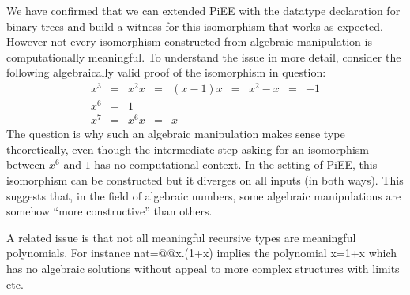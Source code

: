 \documentclass[preprint]{sigplanconf}
\begin{document}
We have confirmed that we can extended {{PiEE}} with the datatype
declaration for binary trees and build a witness for this isomorphism
that works as expected. However not every isomorphism constructed from
algebraic manipulation is computationally meaningful. To understand the
issue in more detail, consider the following algebraically valid proof
of the isomorphism in question:
\[\begin{array}{rclclclcl}
x^3 &=& x^2 x &=& (x-1) x &=& x^2 - x &=& -1 \\
x^6 &=& 1 \\
x^7 &=& x^6 x &=& x
\end{array}\]
The question is why such an algebraic manipulation makes sense type
theoretically, even though the intermediate step asking for an isomorphism
between $x^6$ and $1$ has no computational context. In the setting of
{{PiEE}}, this isomorphism can be constructed but it diverges on all
inputs (in both ways). This suggests that, in the field of algebraic numbers,
some algebraic manipulations are somehow 
``more constructive'' than others.

A related issue is that not all meaningful recursive types are
meaningful polynomials. For instance {{nat=@@x.(1+x)}} implies the
polynomial {{x=1+x}} which has no algebraic solutions without appeal
to more complex structures with limits etc. 





\end{document}
